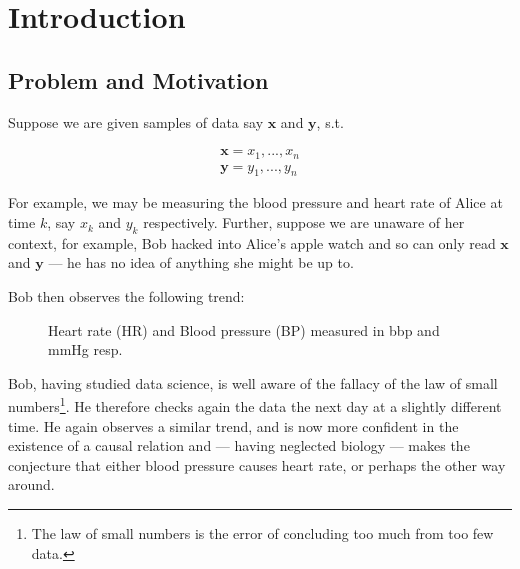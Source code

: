 
\chapter{Introduction}

\section{Problem and Motivation}

Suppose we are given samples of data say $\mathbf{x}$ and $\mathbf{y}$, s.t.

\begin{align*}
    \mathbf{x} = x_1, ..., x_n  \\
    \mathbf{y} = y_1, ..., y_n 
\end{align*}

For example, we may be measuring the blood pressure and heart rate of Alice at time $k$, 
say $x_k$ and $y_k$ respectively. Further, suppose we are unaware of her context, for example,
Bob hacked into Alice's apple watch and so can only read $\mathbf{x}$ and $\mathbf{y}$ --- he has no idea of 
anything she might be up to.

Bob then observes the following trend:

\begin{figure}[htb]
    \centering
    \caption{Heart rate (HR) and Blood pressure (BP) measured in bbp and mmHg resp.}
\end{figure}

Bob, having studied data science, is well aware of the fallacy of the law of small numbers\footnote{
    The law of small numbers is the error of concluding too much from too few data. 
}. He therefore checks again the data the next day at a slightly different time. He again observes 
a similar trend, and is now more confident in the existence of a causal relation and --- having neglected biology --- 
makes the conjecture that either blood pressure causes heart rate, or 
perhaps the other way around. 

